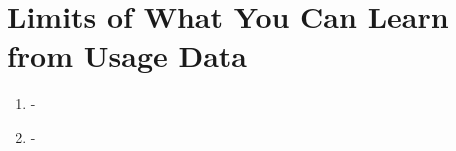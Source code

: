 \section{Limits of What You Can Learn from Usage Data}\label{sec:limitations}

  \begin{enumerate}
  \item - 
  \item -
  \end{enumerate}